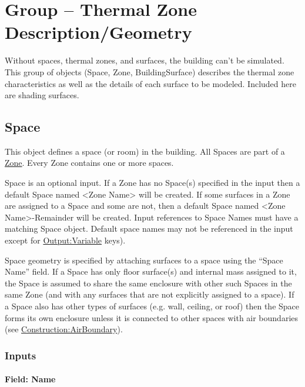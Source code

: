 \section{Group -- Thermal Zone Description/Geometry}\label{group-thermal-zone-descriptiongeometry}

Without spaces, thermal zones, and surfaces, the building can't be simulated. This group of objects (Space, Zone, BuildingSurface) describes the thermal zone characteristics as well as the details of each surface to be modeled. Included here are shading surfaces.

\subsection{Space}\label{space}

This object defines a space (or room) in the building. All Spaces are part of a \hyperref[zone]{Zone}.
Every Zone contains one or more spaces.

Space is an optional input. If a Zone has no Space(s) specified in the input then a default Space named \textless{}Zone Name\textgreater{} will be created.
If some surfaces in a Zone are assigned to a Space and some are not, then a default Space
named \textless{}Zone Name\textgreater{}-Remainder will be created.
Input references to Space Names must have a matching Space object.
Default space names may not be referenced in the input except for \hyperref[outputvariable]{Output:Variable} keys).

Space geometry is specified by attaching surfaces to a space using the ``Space Name'' field. If a Space has only floor surface(s) and internal mass assigned to it, the Space is assumed to share the same enclosure with other such Spaces in the same Zone (and with any surfaces that are not explicitly assigned to a space). If a Space also has other types of surfaces (e.g. wall, ceiling, or roof) then the Space forms its own enclosure unless it is connected to other spaces with air boundaries (see \hyperref[constructionairboundary]{Construction:AirBoundary}).

\subsubsection{Inputs}\label{space-inputs-048}

\paragraph{Field: Name}\label{space-object-name}

